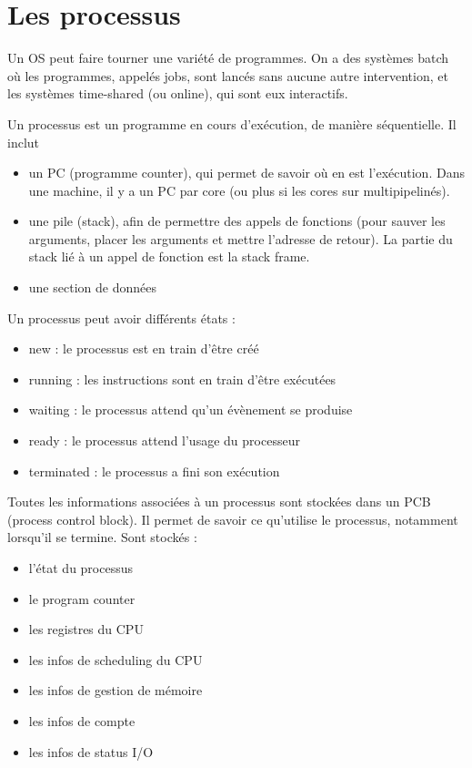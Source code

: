 \chapter{Les processus}

Un OS peut faire tourner une variété de programmes. On a des systèmes batch où les programmes, appelés jobs, sont lancés sans aucune autre intervention, et les systèmes time-shared (ou online), qui sont eux interactifs.

Un processus est un programme en cours d'exécution, de manière séquentielle. Il inclut

\begin{itemize}
	\item un PC (programme counter), qui permet de savoir où en est l'exécution. Dans une machine, il y a un PC par core (ou plus si les cores sur multipipelinés).
	\item une pile (stack), afin de permettre des appels de fonctions (pour sauver les arguments, placer les arguments et mettre l'adresse de retour). La partie du stack lié à un appel de fonction est la stack frame.
	\item une section de données
\end{itemize}


Un processus peut avoir différents états :
\begin{itemize}
	\item new : le processus est en train d'être créé
	\item running : les instructions sont en train d'être exécutées
	\item waiting : le processus attend qu'un évènement se produise
	\item ready : le processus attend l'usage du processeur
	\item terminated : le processus a fini son exécution
\end{itemize}


Toutes les informations associées à un processus sont stockées dans un PCB (process control block). Il permet de savoir ce qu'utilise le processus, notamment lorsqu'il se termine. Sont stockés :

\begin{itemize}
	\item l'état du processus
	\item le program counter
	\item les registres du CPU
	\item les infos de scheduling du CPU
	\item les infos de gestion de mémoire
	\item les infos de compte
	\item les infos de status I/O
\end{itemize}


